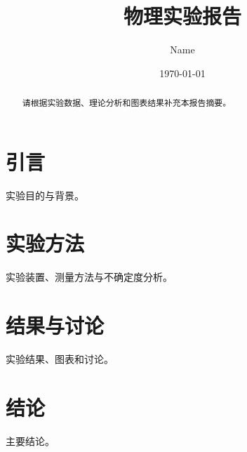 \documentclass{article}
\title{物理实验报告}
\author{Name}
\date{\today}
\begin{document}
\maketitle
\begin{abstract}
请根据实验数据、理论分析和图表结果补充本报告摘要。
\end{abstract}
\section{引言}
实验目的与背景。
\section{实验方法}
实验装置、测量方法与不确定度分析。
\section{结果与讨论}
实验结果、图表和讨论。
\section{结论}
主要结论。
\end{document}
